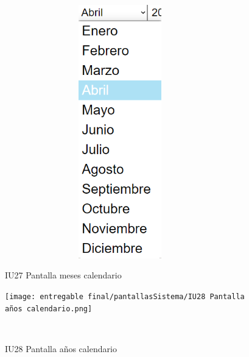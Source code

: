 \begin{figure}[htb]
    \begin{minipage}{1\textwidth}
    \centering
    \includegraphics[width=10cm, height=11cm]{entregable final/pantallasSistema/IU27 Pantalla meses calendario.png}
    \caption{IU27 Pantalla meses calendario}
\end{minipage}

    \begin{minipage}{1\textwidth}
        \centering
        \texttt{[image: entregable final/pantallasSistema/IU28 Pantalla años calendario.png]}
        \caption{IU28 Pantalla años calendario}
    \end{minipage}
    \\
\end{figure}
